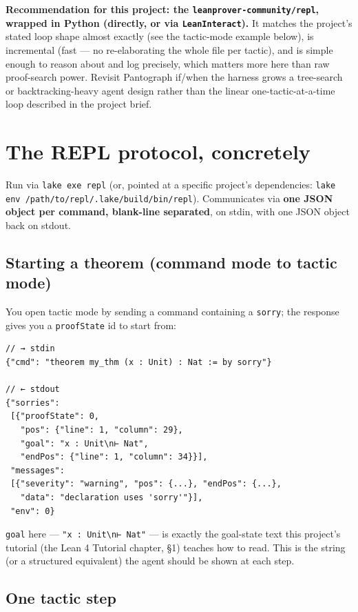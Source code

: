 \textbf{Recommendation for this project: the \texttt{leanprover-community/repl}, wrapped in Python (directly, or via \texttt{LeanInteract}).} It matches the project's stated loop shape almost exactly (see the tactic-mode example below), is incremental (fast --- no re-elaborating the whole file per tactic), and is simple enough to reason about and log precisely, which matters more here than raw proof-search power. Revisit Pantograph if/when the harness grows a tree-search or backtracking-heavy agent design rather than the linear one-tactic-at-a-time loop described in the project brief.

\section{The REPL protocol, concretely}

Run via \texttt{lake exe repl} (or, pointed at a specific project's dependencies: \texttt{lake env /path/to/repl/.lake/build/bin/repl}). Communicates via \textbf{one JSON object per command, blank-line separated}, on stdin, with one JSON object back on stdout.

\subsection{Starting a theorem (command mode to tactic mode)}

You open tactic mode by sending a command containing a \texttt{sorry}; the response gives you a \texttt{proofState} id to start from:

\begin{verbatim}
// → stdin
{"cmd": "theorem my_thm (x : Unit) : Nat := by sorry"}

// ← stdout
{"sorries":
 [{"proofState": 0,
   "pos": {"line": 1, "column": 29},
   "goal": "x : Unit\n⊢ Nat",
   "endPos": {"line": 1, "column": 34}}],
 "messages":
 [{"severity": "warning", "pos": {...}, "endPos": {...},
   "data": "declaration uses 'sorry'"}],
 "env": 0}
\end{verbatim}

\texttt{goal} here --- \texttt{"x : Unit\textbackslash{}n⊢ Nat"} --- is exactly the goal-state text this project's tutorial (the Lean 4 Tutorial chapter, \S1) teaches how to read. This is the string (or a structured equivalent) the agent should be shown at each step.

\subsection{One tactic step}

